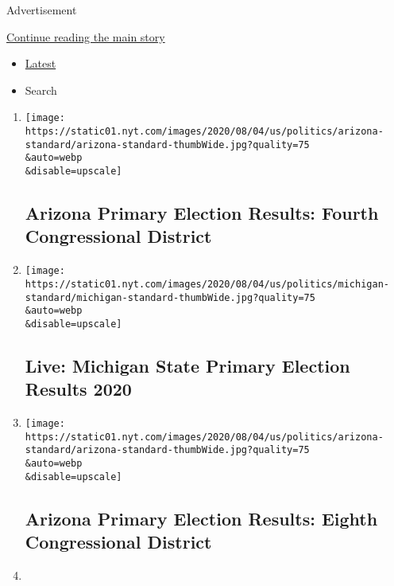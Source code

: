 Advertisement

\protect\hyperlink{after-mid1}{Continue reading the main story}

\begin{itemize}
\tightlist
\item
  \protect\hyperlink{stream-panel}{Latest}
\item
  Search
\end{itemize}

\begin{enumerate}
\def\labelenumi{\arabic{enumi}.}
\item
  \href{/interactive/2020/08/04/us/elections/results-arizona-house-district-4-primary-election.html}{}

  \texttt{[image: https://static01.nyt.com/images/2020/08/04/us/politics/arizona-standard/arizona-standard-thumbWide.jpg?quality=75\\\&auto=webp\\\&disable=upscale]}

  \hypertarget{arizona-primary-election-results-fourth-congressional-district}{%
  \subsection{Arizona Primary Election Results: Fourth Congressional
  District}\label{arizona-primary-election-results-fourth-congressional-district}}
\item
  \href{/interactive/2020/08/04/us/elections/results-michigan-primary-elections.html}{}

  \texttt{[image: https://static01.nyt.com/images/2020/08/04/us/politics/michigan-standard/michigan-standard-thumbWide.jpg?quality=75\\\&auto=webp\\\&disable=upscale]}

  \hypertarget{live-michigan-state-primary-election-results-2020}{%
  \subsection{Live: Michigan State Primary Election Results
  2020}\label{live-michigan-state-primary-election-results-2020}}
\item
  \href{/interactive/2020/08/04/us/elections/results-arizona-house-district-8-primary-election.html}{}

  \texttt{[image: https://static01.nyt.com/images/2020/08/04/us/politics/arizona-standard/arizona-standard-thumbWide.jpg?quality=75\\\&auto=webp\\\&disable=upscale]}

  \hypertarget{arizona-primary-election-results-eighth-congressional-district}{%
  \subsection{Arizona Primary Election Results: Eighth Congressional
  District}\label{arizona-primary-election-results-eighth-congressional-district}}
\item
  \href{/interactive/2020/08/04/us/elections/results-michigan-house-district-10-primary-election.html}{}


\end{enumerate}
